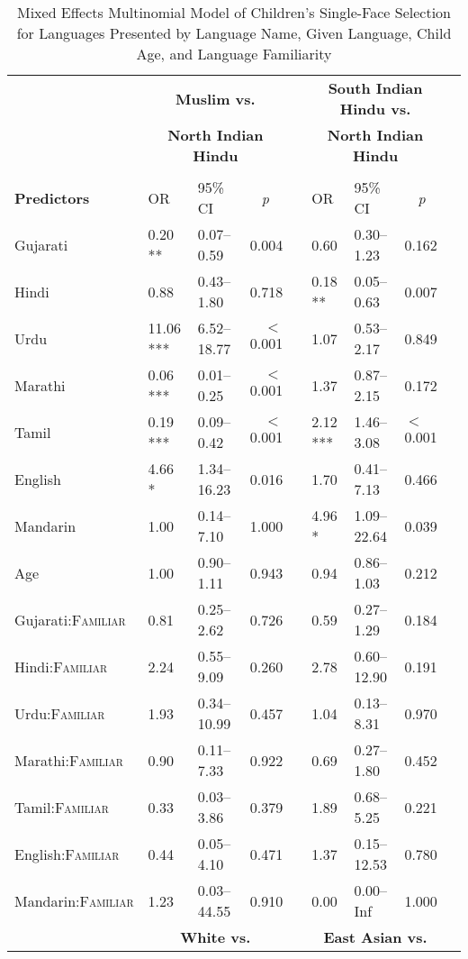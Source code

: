 \begin{table}[ht]
\small
\caption{Mixed Effects Multinomial Model of Children's Single-Face Selection for Languages Presented by Language Name, Given Language, Child Age, and Language Familiarity}\label{tab:flimod}
    \centering
    \vspace{5pt}
    \setlength{\tabcolsep}{1.75pt} 
\begin{threeparttable}
\begin{tabular}{lllrllllr}
 \toprule
& \multicolumn{3}{c}{\textbf{Muslim vs.}} & & \multicolumn{3}{c}{\textbf{South Indian Hindu vs.}}\\
& \multicolumn{3}{c}{\textbf{North Indian Hindu}\tnote{a}} & & \multicolumn{3}{c}{\textbf{North Indian Hindu}\tnote{a}}\\
\cline{2-4} \cline{6-8} \\[-.75em]
\textbf{Predictors} & OR & 95\% CI & \multicolumn{1}{c}{\textit{p}} & & OR & 95\% CI & \multicolumn{1}{c}{\textit{p}} \\ 
\midrule
Gujarati & 0.20 ** & 0.07--0.59 & 0.004 &  & 0.60 & 0.30--1.23 & 0.162 \\ 
 Hindi & 0.88 & 0.43--1.80 & 0.718 &  & 0.18 ** & 0.05--0.63 & 0.007 \\ 
 Urdu & 11.06 *** & 6.52--18.77 & $<$0.001 &  & 1.07 & 0.53--2.17 & 0.849 \\ 
 Marathi & 0.06 *** & 0.01--0.25 & $<$0.001 &  & 1.37 & 0.87--2.15 & 0.172 \\ 
 Tamil & 0.19 *** & 0.09--0.42 & $<$0.001 &  & 2.12 *** & 1.46--3.08 & $<$0.001 \\ 
 English & 4.66 * & 1.34--16.23 & 0.016 &  & 1.70 & 0.41--7.13 & 0.466 \\ 
 Mandarin & 1.00 & 0.14--7.10 & 1.000 &  & 4.96 * & 1.09--22.64 & 0.039 \\ 
 Age\tnote{b} & 1.00 & 0.90--1.11 & 0.943 &  & 0.94 & 0.86--1.03 & 0.212 \\ 
Gujarati:\textsc{Familiar} & 0.81 & 0.25--2.62 & 0.726 &  & 0.59 & 0.27--1.29 & 0.184 \\ 
 Hindi:\textsc{Familiar} & 2.24 & 0.55--9.09 & 0.260 &  & 2.78 & 0.60--12.90 & 0.191 \\ 
 Urdu:\textsc{Familiar} & 1.93 & 0.34--10.99 & 0.457 &  & 1.04 & 0.13--8.31 & 0.970 \\ 
 Marathi:\textsc{Familiar} & 0.90 & 0.11--7.33 & 0.922 &  & 0.69 & 0.27--1.80 & 0.452 \\ 
 Tamil:\textsc{Familiar} & 0.33 & 0.03--3.86 & 0.379 &  & 1.89 & 0.68--5.25 & 0.221 \\ 
 English:\textsc{Familiar} & 0.44 & 0.05--4.10 & 0.471 &  & 1.37 & 0.15--12.53 & 0.780 \\ 
 Mandarin:\textsc{Familiar} & 1.23 & 0.03--44.55 & 0.910 &  & 0.00 & 0.00--Inf & 1.000 \\ 
\midrule
& 
\multicolumn{3}{c}{\textbf{White vs.}} & &
\multicolumn{3}{c}{\textbf{East Asian vs.}}\\


\end{tabular}
\end{threeparttable}
\end{table}

